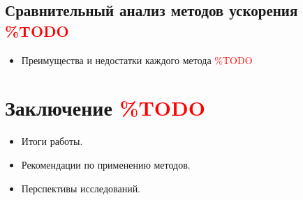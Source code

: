 \documentclass[12pt]{article}
\begin{document}
\subsection{Сравнительный анализ методов ускорения \textcolor{red}{\%TODO}}
\begin{itemize}
    \item Преимущества и недостатки каждого метода \textcolor{red}{\%TODO}
\end{itemize}

\section{Заключение \textcolor{red}{\%TODO}} 
\begin{itemize}
    \item Итоги работы.
    \item Рекомендации по применению методов.
    \item Перспективы исследований.
\end{itemize}
\end{document}

